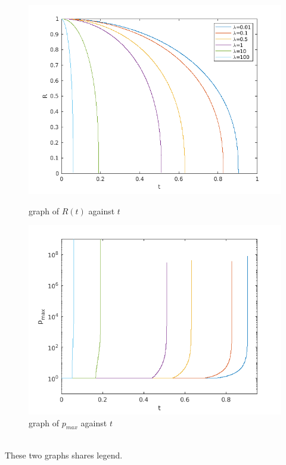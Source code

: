 \documentclass[10pt]{article}
\begin{document}
\begin{figure}[ht]
    \begin{minipage}[b]{0.55\linewidth}
            \centering
            \includegraphics[width=\textwidth]{q4/q4_R.png}
            \caption{graph of $R(t)$ against $t$}
        \end{minipage}
        \hfill
        \begin{minipage}[b]{0.55\linewidth}
            \centering
            \includegraphics[width=\textwidth]{q4/q4_Pmax.png}
            \caption{graph of $p_{max}$ against $t$}
        \end{minipage}
\end{figure}\\
These two graphs shares legend.\\
\end{document}
